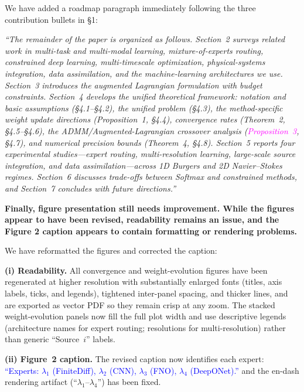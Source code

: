 \documentclass{article}
\newenvironment{QandA}{\begin{enumerate}[label=\bfseries\alph*.]\bfseries}
                      {\end{enumerate}}
\newenvironment{answered}{\par\normalfont}{}
\newcommand{\rtwo}[1]{\textcolor{blue}{#1}}      %
\newcommand{\audit}[1]{\textcolor{magenta}{#1}}  %
\begin{document}
\begin{answered}
We have added a roadmap paragraph immediately following the three contribution
bullets in \S1:

\emph{``The remainder of the paper is organized as follows.
Section~2 surveys related work in multi-task and multi-modal learning,
mixture-of-experts routing, constrained deep learning, multi-timescale
optimization, physical-systems integration, data assimilation, and the
machine-learning architectures we use. Section~3 introduces the augmented
Lagrangian formulation with budget constraints. Section~4 develops the
unified theoretical framework: notation and basic assumptions (\S4.1--\S4.2),
the unified problem (\S4.3), the method-specific weight update directions
(Proposition~1, \S4.4), convergence rates (Theorem~2, \S4.5--\S4.6), the
ADMM/Augmented-Lagrangian crossover analysis (\audit{Proposition~3}, \S4.7), and
numerical precision bounds (Theorem~4, \S4.8). Section~5 reports four
experimental studies---expert routing, multi-resolution learning, large-scale
source integration, and data assimilation---across 1D Burgers and 2D
Navier--Stokes regimes. Section~6 discusses trade-offs between Softmax and
constrained methods, and Section~7 concludes with future directions.''}
\end{answered}

\begin{QandA}
Finally, figure presentation still needs improvement. While the figures appear to have been revised, readability remains an issue, and the Figure 2 caption appears to contain formatting or rendering problems.
\end{QandA}

\begin{answered}
We have reformatted the figures and corrected the caption:

\textbf{(i) Readability.} All convergence and weight-evolution figures have
been regenerated at higher resolution with substantially enlarged fonts
(titles, axis labels, ticks, and legends), tightened inter-panel spacing, and
thicker lines, and are exported as vector PDF so they remain crisp at any zoom.
The stacked weight-evolution panels now fill the full plot width and use
descriptive legends (architecture names for expert routing; resolutions for
multi-resolution) rather than generic ``Source~$i$'' labels.

\textbf{(ii) Figure~2 caption.} The revised caption now identifies each expert:
\rtwo{``Experts: $\lambda_1$ (FiniteDiff), $\lambda_2$ (CNN), $\lambda_3$ (FNO),
$\lambda_4$ (DeepONet).''} and the en-dash rendering artifact
(``$\lambda_1$--$\lambda_4$'') has been fixed.
\end{answered}
\end{document}
